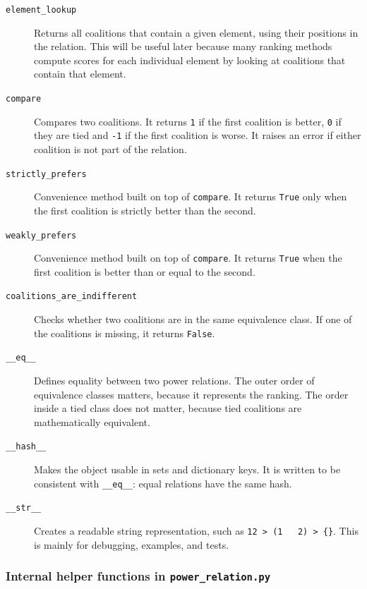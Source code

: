 \documentclass[11pt]{article}
\begin{document}
\begin{description}
  \item[\texttt{element\_lookup}]
Returns all coalitions that contain a given element, using their positions in
the relation. This will be useful later because many ranking methods compute
scores for each individual element by looking at coalitions that contain that
element.

  \item[\texttt{compare}]
Compares two coalitions. It returns \texttt{1} if the first coalition is
better, \texttt{0} if they are tied and \texttt{-1} if the first coalition is
worse. It raises an error if either coalition is not part of the relation.

  \item[\texttt{strictly\_prefers}]
Convenience method built on top of \texttt{compare}. It returns
\texttt{True} only when the first coalition is strictly better than the
second.

  \item[\texttt{weakly\_prefers}]
Convenience method built on top of \texttt{compare}. It returns
\texttt{True} when the first coalition is better than or equal to the second.

  \item[\texttt{coalitions\_are\_indifferent}]
Checks whether two coalitions are in the same equivalence class. If one of
the coalitions is missing, it returns \texttt{False}.

  \item[\texttt{\_\_eq\_\_}]
Defines equality between two power relations. The outer order of equivalence
classes matters, because it represents the ranking. The order inside a tied
class does not matter, because tied coalitions are mathematically equivalent.

  \item[\texttt{\_\_hash\_\_}]
Makes the object usable in sets and dictionary keys. It is written to be
consistent with \texttt{\_\_eq\_\_}: equal relations have the same hash.

  \item[\texttt{\_\_str\_\_}]
Creates a readable string representation, such as
\texttt{12 > (1 \string~ 2) > \{\}}. This is mainly for debugging, examples,
and tests.
\end{description}

\subsubsection*{Internal helper functions in \texttt{power\_relation.py}}
\end{document}
